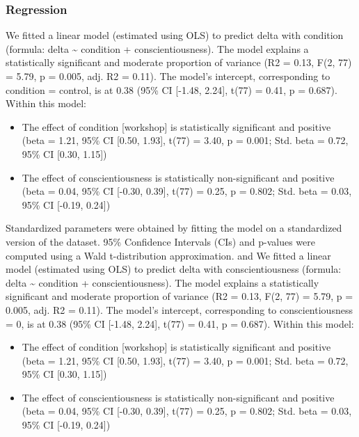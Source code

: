 \documentclass[
  man]{apa6}
\providecommand{\tightlist}{%
  \setlength{\itemsep}{0pt}\setlength{\parskip}{0pt}}
\begin{document}
\hypertarget{regression}{%
\subsubsection{Regression}\label{regression}}

We fitted a linear model (estimated using OLS) to predict delta with condition
(formula: delta \textasciitilde{} condition + conscientiousness). The model explains a
statistically significant and moderate proportion of variance (R2 = 0.13, F(2,
77) = 5.79, p = 0.005, adj. R2 = 0.11). The model's intercept, corresponding to
condition = control, is at 0.38 (95\% CI {[}-1.48, 2.24{]}, t(77) = 0.41, p =
0.687). Within this model:

\begin{itemize}
\tightlist
\item
  The effect of condition {[}workshop{]} is statistically significant and positive
  (beta = 1.21, 95\% CI {[}0.50, 1.93{]}, t(77) = 3.40, p = 0.001; Std. beta = 0.72,
  95\% CI {[}0.30, 1.15{]})
\item
  The effect of conscientiousness is statistically non-significant and positive
  (beta = 0.04, 95\% CI {[}-0.30, 0.39{]}, t(77) = 0.25, p = 0.802; Std. beta = 0.03,
  95\% CI {[}-0.19, 0.24{]})
\end{itemize}

Standardized parameters were obtained by fitting the model on a standardized
version of the dataset. 95\% Confidence Intervals (CIs) and p-values were
computed using a Wald t-distribution approximation. and We fitted a linear
model (estimated using OLS) to predict delta with conscientiousness (formula:
delta \textasciitilde{} condition + conscientiousness). The model explains a statistically
significant and moderate proportion of variance (R2 = 0.13, F(2, 77) = 5.79, p
= 0.005, adj. R2 = 0.11). The model's intercept, corresponding to
conscientiousness = 0, is at 0.38 (95\% CI {[}-1.48, 2.24{]}, t(77) = 0.41, p =
0.687). Within this model:

\begin{itemize}
\tightlist
\item
  The effect of condition {[}workshop{]} is statistically significant and positive
  (beta = 1.21, 95\% CI {[}0.50, 1.93{]}, t(77) = 3.40, p = 0.001; Std. beta = 0.72,
  95\% CI {[}0.30, 1.15{]})
\item
  The effect of conscientiousness is statistically non-significant and positive
  (beta = 0.04, 95\% CI {[}-0.30, 0.39{]}, t(77) = 0.25, p = 0.802; Std. beta = 0.03,
  95\% CI {[}-0.19, 0.24{]})
\end{itemize}
\end{document}
